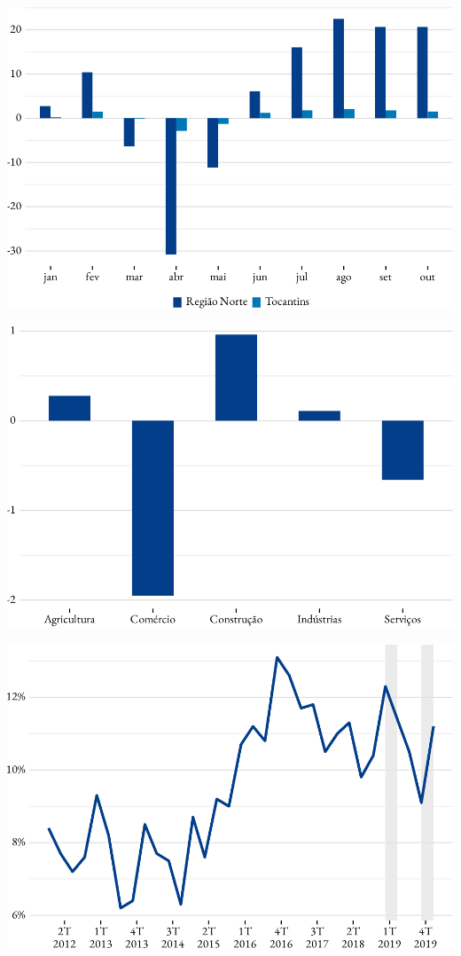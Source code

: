 \includegraphics{fig/saldo-1.pdf}

\includegraphics{fig/saldo_setor_to-1.pdf}

\includegraphics{fig/tx_desemprego_to-1.pdf}

